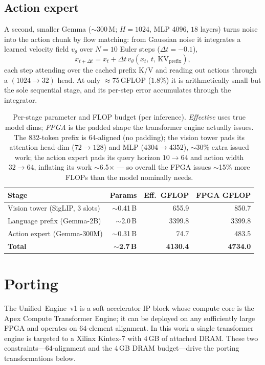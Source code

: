 \documentclass[11pt]{article}
\newcommand{\ue}{Unified~Engine}
\begin{document}
\subsection{Action expert}
A second, smaller Gemma ($\sim$300\,M; $H{=}1024$, MLP $4096$, $18$ layers)
turns noise into the action chunk by flow matching: from Gaussian noise it
integrates a learned velocity field $v_\theta$ over $N{=}10$ Euler steps
($\Delta t{=}-0.1$),
\begin{equation}
x_{t+\Delta t}=x_t+\Delta t\,v_\theta\!\left(x_t,\,t,\,\mathrm{KV}_{\text{prefix}}\right),
\label{eq:euler}
\end{equation}
each step attending over the cached prefix K/V and reading out actions through a
$(1024{\to}32)$ head. At only $\approx$75\,GFLOP ($1.8\%$) it is arithmetically
small but the sole sequential stage, and its per-step error accumulates through
the integrator.

\begin{table}[H]
\centering\small
\caption{Per-stage parameter and FLOP budget (per inference). \emph{Effective}
uses true model dims; \emph{FPGA} is the padded shape the transformer engine
actually issues. The $832$-token prefix is 64-aligned (no padding); the vision
tower pads its attention head-dim ($72{\to}128$) and MLP ($4304{\to}4352$),
$\sim$30\% extra issued work; the action expert
pads its query horizon $10{\to}64$ and action width $32{\to}64$, inflating its
work $\sim$6.5$\times$ --- so overall the FPGA issues $\sim$15\% more FLOPs than
the model nominally needs.}
\label{tab:budget}
\begin{tabular}{@{}lrrr@{}}
\toprule
\textbf{Stage} & \textbf{Params} & \textbf{Eff.\ GFLOP} & \textbf{FPGA GFLOP} \\
\midrule
Vision tower (SigLIP, 3 slots) & $\sim$0.41\,B & 655.9 & 850.7 \\
Language prefix (Gemma-2B)     & $\sim$2.0\,B  & 3399.8 & 3399.8 \\
Action expert (Gemma-300M)     & $\sim$0.31\,B & 74.7 & 483.5 \\
\midrule
\textbf{Total} & \textbf{$\sim$2.7\,B} & \textbf{4130.4} & \textbf{4734.0} \\
\bottomrule
\end{tabular}
\end{table}

\section{Porting}
\label{sec:port}
The \ue{}~v1 is a soft accelerator IP block whose compute core is the Apex
Compute Transformer Engine; it can be deployed on any
sufficiently large FPGA and operates on $64$-element alignment. In this work a
single transformer engine is targeted to a Xilinx Kintex-7 with $4$\,GB of
attached DRAM. These two
constraints---$64$-alignment and the $4$\,GB DRAM budget---drive the porting
transformations below.
\end{document}
